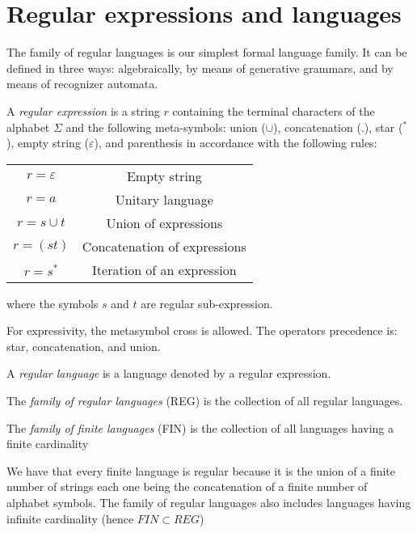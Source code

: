\section{Regular expressions and languages}

The family of regular languages is our simplest formal language family. It can be defined in three ways: algebraically, by means of generative grammars, and by means of 
recognizer automata. 
\begin{definition}
    A \emph{regular expression} is a string $r$ containing the terminal characters of the alphabet $\Sigma$ and the following meta-symbols: union ($\cup$), concatenation ($.$), 
    star ($^{*}$), empty string ($\varepsilon$), and parenthesis in accordance with the following rules:
    \begin{table}[H]
        \centering
        \begin{tabular}{|cc|}
        \hline
        $r=\varepsilon$ & Empty string                 \\
        $r=a$           & Unitary language             \\
        $r=s \cup t$    & Union of expressions         \\
        $r=(st)$        & Concatenation of expressions \\
        $r=s^{*}$       & Iteration of an expression   \\ \hline
        \end{tabular}
    \end{table}
    where the symbols $s$ and $t$ are regular sub-expression. 
\end{definition}
For expressivity, the metasymbol cross is allowed. The operators precedence is: star, concatenation, and union. 
\begin{definition}
    A \emph{regular language} is a language denoted by a regular expression. 

    The \emph{family of regular languages} (REG) is the collection of all regular languages. 

    The \emph{family of finite languages} (FIN) is the collection of all languages having a finite cardinality
\end{definition}
We have that every finite language is regular because it is the union of a finite number of strings each one being the concatenation of a finite 
number of alphabet symbols. The family of regular languages also includes languages having infinite cardinality (hence $FIN \subset REG$)

